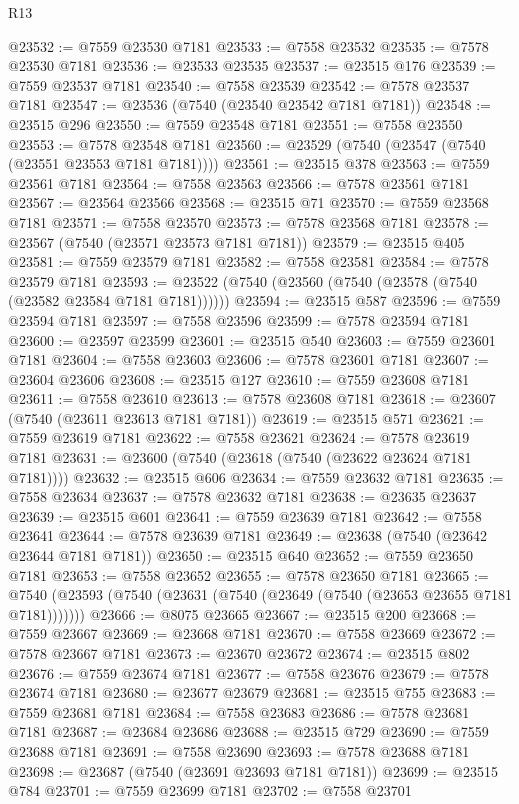 \begin{lexlean}{R13}
\begin{coremodule}
@23532 := @7559 @23530 @7181
@23533 := @7558 @23532
@23535 := @7578 @23530 @7181
@23536 := @23533 @23535
@23537 := @23515 @176
@23539 := @7559 @23537 @7181
@23540 := @7558 @23539
@23542 := @7578 @23537 @7181
@23547 := @23536 (@7540 (@23540 @23542 @7181 @7181))
@23548 := @23515 @296
@23550 := @7559 @23548 @7181
@23551 := @7558 @23550
@23553 := @7578 @23548 @7181
@23560 := @23529 (@7540 (@23547 (@7540 (@23551 @23553 @7181 @7181))))
@23561 := @23515 @378
@23563 := @7559 @23561 @7181
@23564 := @7558 @23563
@23566 := @7578 @23561 @7181
@23567 := @23564 @23566
@23568 := @23515 @71
@23570 := @7559 @23568 @7181
@23571 := @7558 @23570
@23573 := @7578 @23568 @7181
@23578 := @23567 (@7540 (@23571 @23573 @7181 @7181))
@23579 := @23515 @405
@23581 := @7559 @23579 @7181
@23582 := @7558 @23581
@23584 := @7578 @23579 @7181
@23593 := @23522 (@7540 (@23560 (@7540 (@23578 (@7540 (@23582 @23584 @7181 @7181))))))
@23594 := @23515 @587
@23596 := @7559 @23594 @7181
@23597 := @7558 @23596
@23599 := @7578 @23594 @7181
@23600 := @23597 @23599
@23601 := @23515 @540
@23603 := @7559 @23601 @7181
@23604 := @7558 @23603
@23606 := @7578 @23601 @7181
@23607 := @23604 @23606
@23608 := @23515 @127
@23610 := @7559 @23608 @7181
@23611 := @7558 @23610
@23613 := @7578 @23608 @7181
@23618 := @23607 (@7540 (@23611 @23613 @7181 @7181))
@23619 := @23515 @571
@23621 := @7559 @23619 @7181
@23622 := @7558 @23621
@23624 := @7578 @23619 @7181
@23631 := @23600 (@7540 (@23618 (@7540 (@23622 @23624 @7181 @7181))))
@23632 := @23515 @606
@23634 := @7559 @23632 @7181
@23635 := @7558 @23634
@23637 := @7578 @23632 @7181
@23638 := @23635 @23637
@23639 := @23515 @601
@23641 := @7559 @23639 @7181
@23642 := @7558 @23641
@23644 := @7578 @23639 @7181
@23649 := @23638 (@7540 (@23642 @23644 @7181 @7181))
@23650 := @23515 @640
@23652 := @7559 @23650 @7181
@23653 := @7558 @23652
@23655 := @7578 @23650 @7181
@23665 := @7540 (@23593 (@7540 (@23631 (@7540 (@23649 (@7540 (@23653 @23655 @7181 @7181)))))))
@23666 := @8075 @23665
@23667 := @23515 @200
@23668 := @7559 @23667
@23669 := @23668 @7181
@23670 := @7558 @23669
@23672 := @7578 @23667 @7181
@23673 := @23670 @23672
@23674 := @23515 @802
@23676 := @7559 @23674 @7181
@23677 := @7558 @23676
@23679 := @7578 @23674 @7181
@23680 := @23677 @23679
@23681 := @23515 @755
@23683 := @7559 @23681 @7181
@23684 := @7558 @23683
@23686 := @7578 @23681 @7181
@23687 := @23684 @23686
@23688 := @23515 @729
@23690 := @7559 @23688 @7181
@23691 := @7558 @23690
@23693 := @7578 @23688 @7181
@23698 := @23687 (@7540 (@23691 @23693 @7181 @7181))
@23699 := @23515 @784
@23701 := @7559 @23699 @7181
@23702 := @7558 @23701

\end{coremodule}
\end{lexlean}
